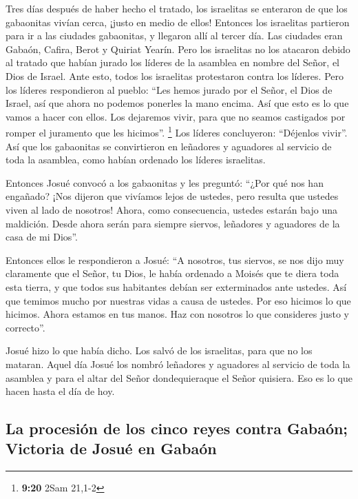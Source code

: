  Tres días después de haber hecho el tratado, los
israelitas se enteraron de que los gabaonitas vivían cerca, ¡justo en
medio de ellos!  Entonces los israelitas partieron para
ir a las ciudades gabaonitas, y llegaron allí al tercer día. Las
ciudades eran Gabaón, Cafira, Berot y Quiriat Yearín. 
Pero los israelitas no los atacaron debido al tratado que habían jurado
los líderes de la asamblea en nombre del Señor, el Dios de Israel. Ante
esto, todos los israelitas protestaron contra los líderes.
 Pero los líderes respondieron al pueblo: ``Les hemos
jurado por el Señor, el Dios de Israel, así que ahora no podemos
ponerles la mano encima.  Así que esto es lo que vamos a
hacer con ellos. Los dejaremos vivir, para que no seamos castigados por
romper el juramento que les hicimos''. \footnote{\textbf{9:20} 2Sam
  21,1-2}  Los líderes concluyeron: ``Déjenlos vivir''.
Así que los gabaonitas se convirtieron en leñadores y aguadores al
servicio de toda la asamblea, como habían ordenado los líderes
israelitas.

 Entonces Josué convocó a los gabaonitas y les preguntó:
``¿Por qué nos han engañado? ¡Nos dijeron que vivíamos lejos de ustedes,
pero resulta que ustedes viven al lado de nosotros! 
Ahora, como consecuencia, ustedes estarán bajo una maldición. Desde
ahora serán para siempre siervos, leñadores y aguadores de la casa de mi
Dios''.

 Entonces ellos le respondieron a Josué: ``A nosotros,
tus siervos, se nos dijo muy claramente que el Señor, tu Dios, le había
ordenado a Moisés que te diera toda esta tierra, y que todos sus
habitantes debían ser exterminados ante ustedes. Así que temimos mucho
por nuestras vidas a causa de ustedes. Por eso hicimos lo que hicimos.
 Ahora estamos en tus manos. Haz con nosotros lo que
consideres justo y correcto''.

 Josué hizo lo que había dicho. Los salvó de los
israelitas, para que no los mataran.  Aquel día Josué los
nombró leñadores y aguadores al servicio de toda la asamblea y para el
altar del Señor dondequieraque el Señor quisiera. Eso es lo que hacen
hasta el día de hoy.

\hypertarget{la-procesiuxf3n-de-los-cinco-reyes-contra-gabauxf3n-victoria-de-josuuxe9-en-gabauxf3n}{%
\subsection{La procesión de los cinco reyes contra Gabaón; Victoria de
Josué en
Gabaón}\label{la-procesiuxf3n-de-los-cinco-reyes-contra-gabauxf3n-victoria-de-josuuxe9-en-gabauxf3n}}

